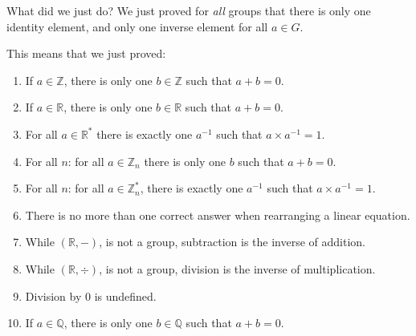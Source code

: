 \begin{namedframe}{What did we just do?}
	We just proved for \emph{all} groups that there is only one identity element, and only one inverse element for all $a \in G$.

	This means that we just proved:
	\begin{enumerate}
		\item If $a \in \mathbb{Z}$, there is only one $b \in \mathbb{Z}$ such that $a + b = 0$.
		\item If $a \in \mathbb{R}$, there is only one $b \in \mathbb{R}$ such that $a + b = 0$.
		\item For all $a \in \mathbb{R^*}$ there is exactly one $a^{-1}$ such that $a \times a^{-1} = 1$.
		\item For all $n$: for all $a \in \mathbb{Z}_n$ there is only one $b$ such that $a + b = 0$.
		\item For all $n$: for all $a \in \mathbb{Z}_n^*$, there is exactly one $a^{-1}$ such that $a \times a^{-1} = 1$.
		\item There is no more than one correct answer when rearranging a linear equation.
		\item While $(\mathbb{R}, -)$, is not a group, subtraction is the inverse of addition.
		\item While $(\mathbb{R}, \div)$, is not a group, division is the inverse of multiplication.
		\item Division by $0$ is undefined.
		\item If $a \in \mathbb{Q}$, there is only one $b \in \mathbb{Q}$ such that $a + b = 0$.
	\end{enumerate}
\end{namedframe}
